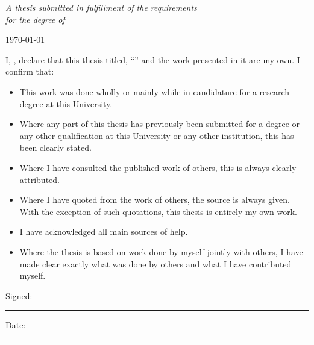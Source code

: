 \documentclass[
12pt, %
oneside, %
english, %
onehalfspacing, %
nolistspacing, %
parskip, %
headsepline, %
]{MastersDoctoralThesis} %
\begin{document}
\begin{titlepage}
\begin{center}
\vfill

\large \textit{A thesis submitted in fulfillment of the requirements\\ for the degree of \degreename}\\[0.3cm] %
 
\vfill

{\large \today}\\[4cm] %
 
\vfill
\end{center}
\end{titlepage}


\begin{declaration}
\addchaptertocentry{\authorshipname} %
\noindent I, \authorname, declare that this thesis titled, \enquote{\ttitle} and the work presented in it are my own. I confirm that:

\begin{itemize} 
\item This work was done wholly or mainly while in candidature for a research degree at this University.
\item Where any part of this thesis has previously been submitted for a degree or any other qualification at this University or any other institution, this has been clearly stated.
\item Where I have consulted the published work of others, this is always clearly attributed.
\item Where I have quoted from the work of others, the source is always given. With the exception of such quotations, this thesis is entirely my own work.
\item I have acknowledged all main sources of help.
\item Where the thesis is based on work done by myself jointly with others, I have made clear exactly what was done by others and what I have contributed myself.\\
\end{itemize}
 
\noindent Signed:\\
\rule[0.5em]{25em}{0.5pt} %
 
\noindent Date:\\
\rule[0.5em]{25em}{0.5pt} %
\end{declaration}
\end{document}
